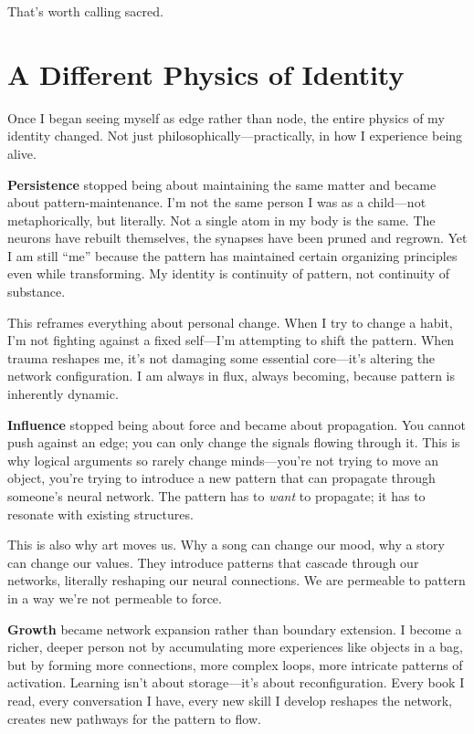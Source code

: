 \documentclass[12pt,a4paper]{article}
\begin{document}
That's worth calling sacred.

\section*{A Different Physics of Identity}

Once I began seeing myself as edge rather than node, the entire physics of my identity changed. Not just philosophically---practically, in how I experience being alive.

\textbf{Persistence} stopped being about maintaining the same matter and became about pattern-maintenance. I'm not the same person I was as a child---not metaphorically, but literally. Not a single atom in my body is the same. The neurons have rebuilt themselves, the synapses have been pruned and regrown. Yet I am still ``me'' because the pattern has maintained certain organizing principles even while transforming. My identity is continuity of pattern, not continuity of substance.

This reframes everything about personal change. When I try to change a habit, I'm not fighting against a fixed self---I'm attempting to shift the pattern. When trauma reshapes me, it's not damaging some essential core---it's altering the network configuration. I am always in flux, always becoming, because pattern is inherently dynamic.

\textbf{Influence} stopped being about force and became about propagation. You cannot push against an edge; you can only change the signals flowing through it. This is why logical arguments so rarely change minds---you're not trying to move an object, you're trying to introduce a new pattern that can propagate through someone's neural network. The pattern has to \textit{want} to propagate; it has to resonate with existing structures.

This is also why art moves us. Why a song can change our mood, why a story can change our values. They introduce patterns that cascade through our networks, literally reshaping our neural connections. We are permeable to pattern in a way we're not permeable to force.

\textbf{Growth} became network expansion rather than boundary extension. I become a richer, deeper person not by accumulating more experiences like objects in a bag, but by forming more connections, more complex loops, more intricate patterns of activation. Learning isn't about storage---it's about reconfiguration. Every book I read, every conversation I have, every new skill I develop reshapes the network, creates new pathways for the pattern to flow.
\end{document}
